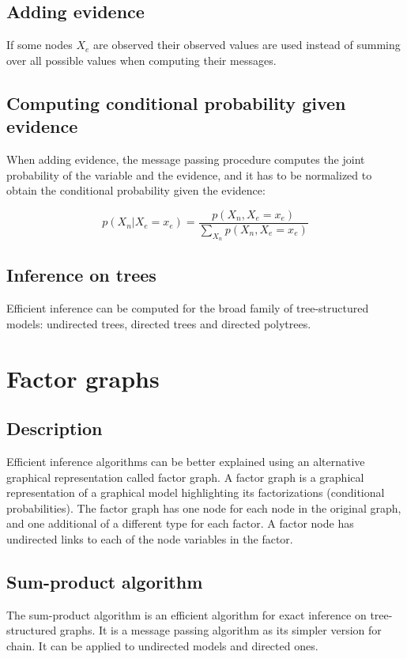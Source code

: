	\subsection{Adding evidence}
	If some nodes $X_e$ are observed their observed values are used instead of summing over all possible values when computing their messages.

	\subsection{Computing conditional probability given evidence}
	When adding evidence, the message passing procedure computes the joint probability of the variable and the evidence, and it has to be normalized to obtain the conditional probability given the evidence:

	$$p(X_n|X_e =x_e) = \frac{p(X_n, X_e = x_e)}{\sum\limits_{X_n}p(X_n, X_e = x_e)}$$

	\subsection{Inference on trees}
	Efficient inference can be computed for the broad family  of tree-structured models: undirected trees, directed trees and directed polytrees.

\section{Factor graphs}

	\subsection{Description}
	Efficient inference algorithms can be better explained using an alternative graphical representation called factor graph.
	A factor graph is a graphical representation of a graphical model highlighting its factorizations (conditional probabilities).
	The factor graph has one node for each node in the original graph, and one additional of a different type for each factor.
	A factor node has undirected links to each of the node variables in the factor.

	\subsection{Sum-product algorithm}
	The sum-product algorithm is an efficient algorithm for exact inference on tree-structured graphs.
	It is a message passing algorithm as its simpler version for chain.
	It can be applied to undirected models and directed ones.

